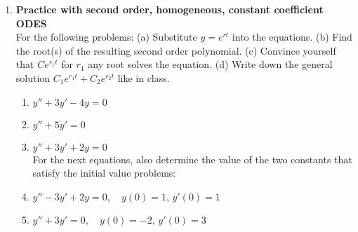 \documentclass[a4paper,12pt,reqno]{article}
\begin{document}
\begin{enumerate}
\begin{enumerate}
\begin{itemize}
\end{itemize}
\end{enumerate}
\item \textbf{Practice with second order, homogeneous, constant coefficient ODES}\\
For the following problems: (a) Substitute $y = e^{rt}$ into the equations. (b) Find the root(s) of the resulting second order polynomial. (c) Convince yourself that $Ce^{r_1 t}$ for $r_1$ any root solves the equation. (d) Write down the general solution $C_1 e^{r_1 t} + C_2 e^{r_2 t}$ like in class.
\begin{enumerate}
\item $y'' + 3y' - 4y = 0$
\item $y'' + 5y' = 0$
\item $y'' + 3y' + 2y = 0$ \\

For the next equations, also determine the value of the two constants that satisfy the initial value problems:
\item $y'' - 3y' + 2y = 0, \quad y(0) = 1, \, y'(0) = 1$
\item $y''+3y' = 0, \quad y(0) = -2, \, y'(0) = 3$
\end{enumerate}

\end{enumerate}
\end{document}
